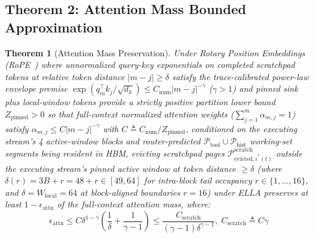 \documentclass[conference,10pt]{IEEEtran}
\newtheorem{theorem}{Theorem}
\begin{document}
\subsection{Theorem 2: Attention Mass Bounded Approximation}
\begin{theorem}[Attention Mass Preservation]
Under Rotary Position Embeddings (RoPE~\cite{su2024roformer}) where unnormalized query-key exponentials on completed scratchpad tokens at relative token distance $|m - j| \ge \delta$ satisfy the trace-calibrated power-law envelope premise $\exp(q_m^\top k_j / \sqrt{d_k}) \le C_{\text{num}} |m - j|^{-\gamma}$ ($\gamma > 1$) and pinned sink plus local-window tokens provide a strictly positive partition lower bound $Z_{\text{pinned}} > 0$ so that full-context normalized attention weights ($\sum_{j=1}^m \alpha_{m,j} = 1$) satisfy $\alpha_{m,j} \le C |m - j|^{-\gamma}$ with $C \triangleq C_{\text{num}} / Z_{\text{pinned}}$, conditioned on the executing stream's 4 active-window blocks and router-predicted $\mathcal{P}_{\text{tool}} \cup \mathcal{P}_{\text{hist}}$ working-set segments being resident in HBM, evicting scratchpad pages $\mathcal{P}_{\text{evicted}, i^*(t)}^{\text{scratch}}$ outside the executing stream's pinned active window at token distance $\ge \delta$ (where $\delta(r) = 3B + r = 48 + r \in [49, 64]$ for intra-block tail occupancy $r \in \{1, \dots, 16\}$, and $\delta = W_{\text{local}} = 64$ at block-aligned boundaries $r = 16$) under ELLA preserves at least $1 - \epsilon_{\text{attn}}$ of the full-context attention mass, where:
\begin{equation}
\label{eq:attn_bound}
\epsilon_{\text{attn}} \le C\delta^{1-\gamma}\!\left(\frac{1}{\delta} + \frac{1}{\gamma - 1}\right) \le \frac{C_{\text{scratch}}}{(\gamma - 1)\delta^{\gamma - 1}}, \; C_{\text{scratch}} \triangleq C\gamma
\end{equation}
\end{theorem}
\end{document}
